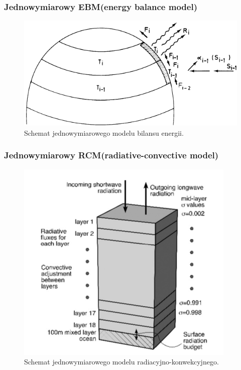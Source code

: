 \documentclass{beamer}
\begin{document}
\begin{frame}
	\frametitle{Jednowymiarowy EBM(energy balance model)}	
	\begin{figure}[h]
		\begin{center}
			\includegraphics[width=0.7\linewidth]{images/1D_EBM.png}
			\caption{Schemat jednowymiarowego modelu bilansu energii.\cite{b3}}
		\end{center}
	\end{figure}
\end{frame}



\begin{frame}
	\frametitle{Jednowymiarowy RCM(radiative-convective model)}	
	\begin{figure}[h]
		\begin{center}
			\includegraphics[width=0.6\linewidth]{images/1D_RC.png}
			\caption{Schemat jednowymiarowego modelu radiacyjno-konwekcyjnego.\cite{b1}}
		\end{center}
	\end{figure}
\end{frame}
\end{document}
